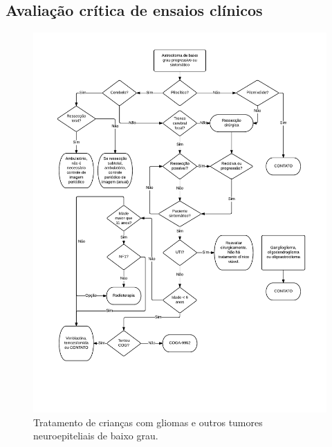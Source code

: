 \documentclass[11pt,a4paper,oldfontcommands]{memoir}
\begin{document}
\subsection{Avaliação crítica de ensaios clínicos}
\begin{figure}[!htb]
\includegraphics[scale=0.87,trim = 18mm 30mm 15mm 12mm,clip]{fig/fig3.pdf}
\caption{Tratamento de crianças com gliomas e outros tumores neuroepiteliais de baixo grau.}
\end{figure}
\end{document}
